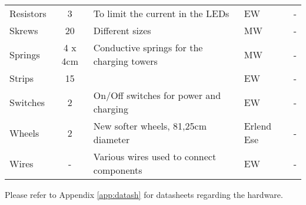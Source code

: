 \begin{sidewaystable}[ht]
\begin{tabular}{|l|c|l|l|c|}
Resistors & 3 & To limit the current in the LEDs & EW & - \\
Skrews & 20 & Different sizes & MW & - \\
Springs & 4 x 4cm & Conductive springs for the charging towers & MW & - \\
Strips & 15 &  & EW & - \\
Switches & 2 & On/Off switches for power and charging & EW & - \\
Wheels & 2 & New softer wheels, 81,25cm diameter & Erlend Ese & - \\
Wires & - & Various wires used to connect components & EW & - \\\hline
\end{tabular}
\end{sidewaystable}

Please refer to Appendix \ref{app:datash} for datasheets regarding the hardware.